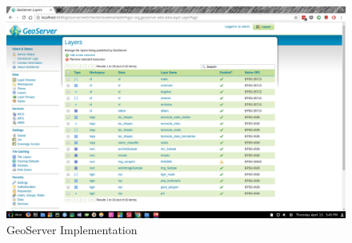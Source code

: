 \begin{figure}[h]
    \centering
    \includegraphics[width=\textwidth]{pix/p8}
    \caption{GeoServer Implementation}
\end{figure}

